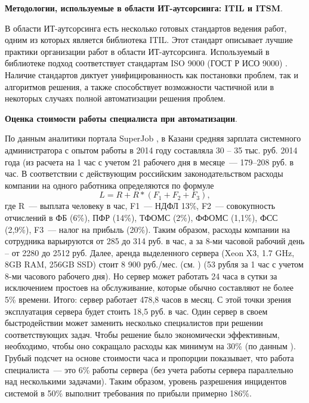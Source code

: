    \par



\textbf{Методологии, используемые в области ИТ-аутсорсинга: ITIL и ITSM}. \par
В области ИТ-аутсорсинга есть несколько готовых стандартов ведения работ, одним из которых является библиотека ITIL. Этот стандарт описывает лучшие практики организации работ в области ИТ-аутсорсинга. Используемый в библиотеке подход соответствует стандартам ISO 9000 (ГОСТ Р ИСО 9000) \cite{ITIL1, ITIL2, ITIL3}.
Наличие стандартов диктует унифицированность как постановки проблем, так и алгоритмов решения, а также способствует возможности частичной или в некоторых случаях полной автоматизации решения проблем. \par

\textbf{Оценка стоимости работы специалиста при автоматизации}.\par
По данным аналитики портала SuperJob \cite{SuperJob}, в Казани средняя зарплата системного администратора с опытом работы в 2014 году составляла 30 – 35 тыс. руб. 2014 года (из расчета на 1 час с учетом 21 рабочего дня в месяце~--- 179--208 руб. в час. В соответствии с действующим российским законодательством \cite{FiscalCodecs} расходы компании на одного работника определяются по формуле
\[
L = R + R*(F_1 +F_2+F_3),
\]
где R~--- выплата человеку в час, F1~--- НДФЛ 13\%, F2~--- совокупность отчислений в ФБ (6\%), ПФР (14\%), ТФОМС (2\%), ФФОМС (1,1\%), ФСС (2,9\%), F3~--- налог на прибыль (20\%). Таким образом, расходы компании на сотрудника варьируются от 285 до 314 руб. в час, а за 8-ми часовой рабочий день – от 2280 до 2512 руб. Далее, аренда выделенного сервера (Xeon X3, 1.7 GHz, 8GB RAM, 256GB SSD) стоит 8 900 руб./мес. (см. \cite{TimeWeb}) (53 рубля за 1 час с учетом 8-ми часового рабочего дня). Но сервер может работать 24 часа в сутки за исключением простоев на обслуживание, которые обычно составляют не более 5\% времени. Итого: сервер работает 478,8 часов в месяц. С этой точки зрения эксплуатация сервера будет стоить 18,5 руб. в час. Один сервер в своем быстродействии может заменить несколько специалистов при решении соответствующих задач. Чтобы решение было экономически эффективным, необходимо, чтобы оно сокращало расходы как минимум на 30\% (по данным \icl). Грубый подсчет на основе стоимости часа и пропорции показывает, что работа специалиста~--- это 6\% работы сервера (без учета работы сервера параллельно над несколькими задачами). Таким образом, уровень разрешения инцидентов системой в 50\% выполнит требования по прибыли примерно 186\%.

